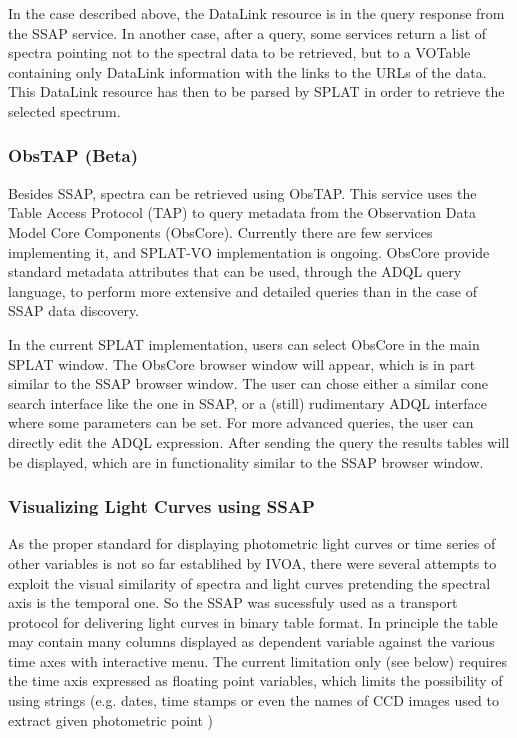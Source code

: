 \documentclass[final,authoryear,5p,times,twocolumn]{elsarticle}
\begin{document}
In the case described above, the DataLink resource is in the query
response from the SSAP service. In another case, after a query, some
services return a list of spectra pointing not to the spectral data to
be retrieved, but to a VOTable containing only DataLink information
with the links to the URLs of the data. This DataLink resource has
then to be parsed by SPLAT in order to retrieve the selected spectrum.

\subsubsection{ObsTAP (Beta)}

Besides SSAP, spectra can be retrieved using ObsTAP. This service uses
the Table Access Protocol (TAP) to query metadata from the Observation
Data Model Core Components (ObsCore). Currently there are few services
implementing it, and SPLAT-VO implementation is ongoing.  ObsCore
provide standard metadata attributes that can be used, through the
ADQL query language, to perform more extensive and detailed queries
than in the case of SSAP data discovery.

In the current SPLAT implementation, users can select ObsCore in the
main SPLAT window. The ObsCore browser window will appear, which is in
part similar to the SSAP browser window. The user can chose either a
similar cone search interface like the one in SSAP, or a (still)
rudimentary ADQL interface where some parameters can be set. For more
advanced queries, the user can directly edit the ADQL
expression. After sending the query the results tables will be
displayed, which are in functionality similar to the SSAP browser
window.


\subsubsection{Visualizing Light Curves using  SSAP}

As the proper standard for displaying photometric light curves or time
series of other variables is not so far establihed by IVOA, there were
several attempts to exploit the visual similarity of spectra and light
curves pretending the spectral axis is the temporal one.  So the SSAP
was sucessfuly used as a transport protocol for delivering light
curves in binary table format. In principle the table may contain many
columns displayed as dependent variable against the various time axes
with interactive menu.  The current limitation only (see below)
requires the time axis expressed as floating point variables, which
limits the possibility of using strings (e.g. dates, time stamps or
even the names of CCD images used to extract given photometric point )
\end{document}
